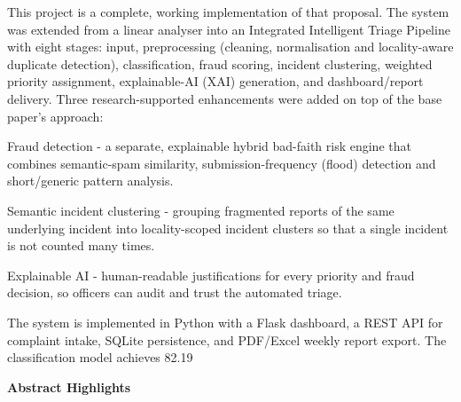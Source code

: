 \documentclass[10pt,letterpaper,oneside]{article}\usepackage{geometry}\geometry{top=1in,bottom=1in,left=1in,right=1in,includeheadfoot}\usepackage{xcolor}\definecolor{color@navy}{HTML}{1F3B63}\definecolor{color@grey}{HTML}{404040}\definecolor{color@hdr}{HTML}{F2F4F7}\usepackage{titlesec}\titleformat{\section}  {\normalfont\huge\bfseries\color@navy}  {}{0pt}{\MakeUppercase}\titleformat{\subsection}  {\normalfont\Large\bfseries\color@navy}  {}{0pt}{}\titleformat{\subsubsection}  {\normalfont\large\bfseries\color@navy}  {}{0pt}{}\titlespacing*{\section}{0pt}{14pt}{6pt}\titlespacing*{\subsection}{0pt}{10pt}{4pt}\titlespacing*{\subsubsection}{0pt}{8pt}{3pt}\setlength{\parindent}{0pt}\setlength{\parskip}{0.6em}\parindent=0pt\usepackage{enumitem}\setlist{nosep,leftmargin=*,itemsep=0pt,topsep=2pt,partopsep=0pt}\usepackage{array}\usepackage{booktabs}\usepackage{caption}\captionsetup{font={small,it},labelfont={bf},labelsep=period,  parskip=2pt,skip=4pt,list=no}\captionsetup[table]{labelfont={bf,small,color@navy},name=Table}\usepackage{graphicx}\usepackage{verbatim}\usepackage{ragged2e}\usepackage{longtable}\usepackage{tabularx}\usepackage{multirow}\usepackage{colortbl}\definecolor{rowshade}{HTML}{F2F4F7}\usepackage{tikz}\usetikzlibrary{positioning,calc}\usepackage[hidelinks]{hyperref}\hypersetup{colorlinks=true,linkcolor=color@navy,urlcolor=color@navy}\pagestyle{fancy}\fancyhf{}\renewcommand{\headrulewidth}{0.4pt}\fancyhead[L]{\small\color@navy CivicSense — Project Report}\fancyhead[R]{\small\color@grey October 11, 2026}\fancyfoot[C]{\small\color@grey An Integrated Intelligent Triage Pipelin}\fancyfoot[R]{\small\color@grey Page \thepage}\usepackage{setspace}\setstretch{1.15}\AtBeginDocument{  \hypersetup{pdftitle={An Integrated Intelligent Triage Pipeline for AI-Enhanced Citizen Complaint Management},    pdfauthor={CivicSense Project Team},    pdfsubject={Project Report},    pdfkeywords={smart cities, NLP, complaint management, e-governance},    pdfcreator={CivicSense Project Team}  }}
\begin{document}
This project is a complete, working implementation of that proposal. The system was extended from a linear analyser into an Integrated Intelligent Triage Pipeline with eight stages: input, preprocessing (cleaning, normalisation and locality-aware duplicate detection), classification, fraud scoring, incident clustering, weighted priority assignment, explainable-AI (XAI) generation, and dashboard/report delivery. Three research-supported enhancements were added on top of the base paper’s approach:

\item Fraud detection - a separate, explainable hybrid bad-faith risk engine that combines semantic-spam similarity, submission-frequency (flood) detection and short/generic pattern analysis.

\item Semantic incident clustering - grouping fragmented reports of the same underlying incident into locality-scoped incident clusters so that a single incident is not counted many times.

\item Explainable AI - human-readable justifications for every priority and fraud decision, so officers can audit and trust the automated triage.

The system is implemented in Python with a Flask dashboard, a REST API for complaint intake, SQLite persistence, and PDF/Excel weekly report export. The classification model achieves 82.19%

\textbf{Abstract Highlights}
\end{document}
